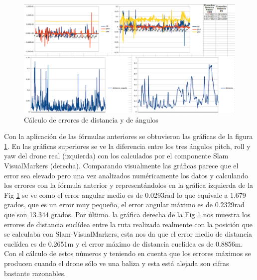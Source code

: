 \begin{figure}[H]
	\begin{center}
		\includegraphics[width=1\textwidth]{imag/IMG36.png}
				\caption{Cálculo de errores de distancia y de ángulos}
		\label{fig:Error de distancia y de giro.}	
	\end{center}
\end{figure}

\hspace{1cm} Con la aplicación de las fórmulas anteriores se obtuvieron las gráficas de la figura \ref{fig:Error de distancia y de giro.}. En las gráficas superiores se ve la diferencia entre los tres ángulos pitch, roll y yaw del drone real (izquierda) con los calculados por el componente Slam VisualMarkers (derecha). Comparando visualmente las gráficas parece que el error sea elevado pero una vez analizados numéricamente los datos y calculando los errores con la fórmula anterior y representándolos en la gráfica izquierda de la Fig \ref{fig:Error de distancia y de giro.} se ve como el error angular medio es de 0.0293rad lo que equivale a 1.679 grados, que es un error muy pequeño, el error angular máximo es de 0.2329rad que son 13.344 grados. Por último. la gráfica derecha de la Fig \ref{fig:Error de distancia y de giro.} nos muestra los errores de distancia euclídea entre la ruta realizada realmente con la posición que se calculaba con Slam-VisualMarkers, esta nos da que el error medio de distancia euclídea es de 0.2651m y el error máximo de distancia euclídea es de 0.8856m. Con el cálculo de estos números y teniendo en cuenta que los errores máximos se producen cuando el drone sólo ve una baliza y esta está alejada son cifras bastante razonables.

